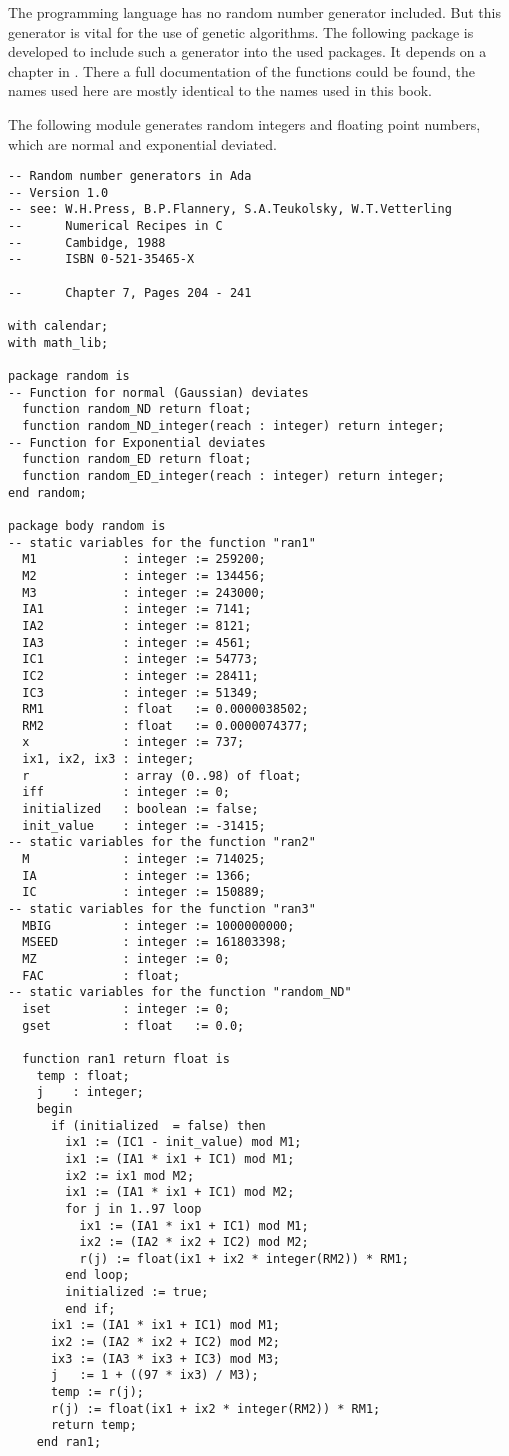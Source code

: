 The programming language has no random number generator included. But this
generator is vital for the use of genetic algorithms. The following package
is developed to include such a generator into the used packages. It depends
on a chapter in \cite{Pre88}. There a full documentation of the functions
could be found, the names used here are mostly identical to the names used in
this book.

The following module generates random integers and floating point numbers, which
are normal and exponential deviated.
\begin{verbatim}
-- Random number generators in Ada
-- Version 1.0
-- see: W.H.Press, B.P.Flannery, S.A.Teukolsky, W.T.Vetterling
--      Numerical Recipes in C
--      Cambidge, 1988
--      ISBN 0-521-35465-X

--      Chapter 7, Pages 204 - 241

with calendar;
with math_lib;

package random is
-- Function for normal (Gaussian) deviates
  function random_ND return float;
  function random_ND_integer(reach : integer) return integer;
-- Function for Exponential deviates
  function random_ED return float;
  function random_ED_integer(reach : integer) return integer;
end random;

package body random is
-- static variables for the function "ran1"
  M1            : integer := 259200;
  M2            : integer := 134456;
  M3            : integer := 243000;
  IA1           : integer := 7141;
  IA2           : integer := 8121;
  IA3           : integer := 4561;
  IC1           : integer := 54773;
  IC2           : integer := 28411;
  IC3           : integer := 51349;
  RM1           : float   := 0.0000038502;
  RM2           : float   := 0.0000074377;
  x             : integer := 737;
  ix1, ix2, ix3 : integer;
  r             : array (0..98) of float;
  iff           : integer := 0;
  initialized   : boolean := false;
  init_value    : integer := -31415;
-- static variables for the function "ran2"
  M             : integer := 714025;
  IA            : integer := 1366;
  IC            : integer := 150889;
-- static variables for the function "ran3"
  MBIG          : integer := 1000000000;
  MSEED         : integer := 161803398;
  MZ            : integer := 0;
  FAC           : float;
-- static variables for the function "random_ND"
  iset          : integer := 0;
  gset          : float   := 0.0;

  function ran1 return float is
    temp : float;
    j    : integer;
    begin
      if (initialized  = false) then
        ix1 := (IC1 - init_value) mod M1;
        ix1 := (IA1 * ix1 + IC1) mod M1;
        ix2 := ix1 mod M2;
        ix1 := (IA1 * ix1 + IC1) mod M2;
        for j in 1..97 loop
          ix1 := (IA1 * ix1 + IC1) mod M1;
          ix2 := (IA2 * ix2 + IC2) mod M2;
          r(j) := float(ix1 + ix2 * integer(RM2)) * RM1;
        end loop;
        initialized := true;
        end if;
      ix1 := (IA1 * ix1 + IC1) mod M1;
      ix2 := (IA2 * ix2 + IC2) mod M2;
      ix3 := (IA3 * ix3 + IC3) mod M3;
      j   := 1 + ((97 * ix3) / M3);
      temp := r(j);
      r(j) := float(ix1 + ix2 * integer(RM2)) * RM1;
      return temp;
    end ran1;


\end{verbatim}
